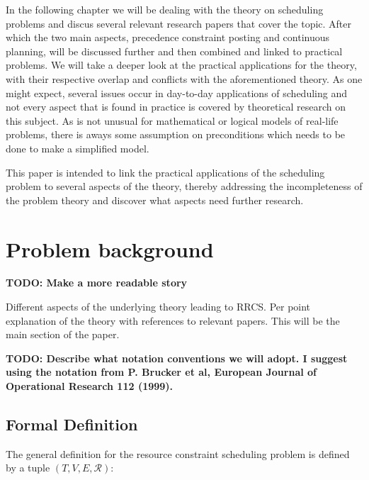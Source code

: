 \documentclass{article}
\newcommand{\TODO}[1]{{\color{red}\textbf{TODO: #1}}}
\begin{document}
In the following chapter we will be dealing with the theory on scheduling problems and discus several relevant research papers that cover the topic.
After which the two main aspects, precedence constraint posting and continuous planning, will be discussed further and then combined and linked to practical problems.
We will take a deeper look at the practical applications for the theory, with their respective overlap and conflicts with the aforementioned theory.
As one might expect, several issues occur in day-to-day applications of scheduling and not every aspect that is found in practice is covered by theoretical research on this subject.
As is not unusual for mathematical or logical models of real-life problems, there is aways some assumption on preconditions which needs to be done to make a simplified model.

This paper is intended to link the practical applications of the scheduling problem to several aspects of the theory, thereby addressing the incompleteness of the problem theory and discover what aspects need further research.

\newpage

\section{Problem background}

\TODO{Make a more readable story}

Different aspects of the underlying theory leading to RRCS.  Per point explanation of the theory with references to relevant papers. This will be the main section of the paper.

\TODO{Describe what notation conventions we will adopt. I suggest using the notation from P. Brucker et al, European Journal of Operational Research 112 (1999). }

\subsection{Formal Definition}
The general definition for the resource constraint scheduling problem is defined by a tuple $(T, V, E, \mathcal{R})$: \cite{brucker99}
\end{document}
